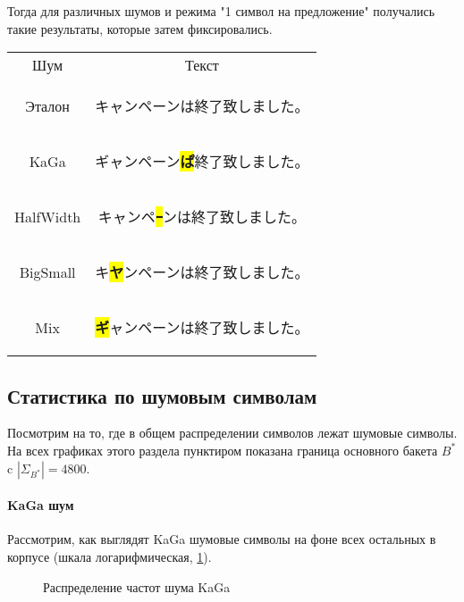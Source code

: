 Тогда для различных шумов и режима "1 символ на предложение" получались такие результаты, которые затем фиксировались.

\begin{tabular}{c|c}
	Шум 	& Текст\\
	Эталон 	& \begin{CJK}{UTF8}{min}キャンペーンは終了致しました。 \end{CJK} \\
	KaGa	&  \begin{CJK}{UTF8}{min}ギャンペーン\colorbox{yellow}{\textbf{ぱ}}終了致しました。 \end{CJK} \\
	HalfWidth &  \begin{CJK}{UTF8}{min}キャンペ\colorbox{yellow}{\textbf{ｰ}}ンは終了致しました。 \end{CJK} \\
	BigSmall &  \begin{CJK}{UTF8}{min}キ\colorbox{yellow}{\textbf{ヤ}}ンペーンは終了致しました。 \end{CJK} \\
	Mix 	&  \begin{CJK}{UTF8}{min}\colorbox{yellow}{\textbf{ギ}}ャンペーンは終了致しました。 \end{CJK} 
\end{tabular}

\subsection{ Статистика по шумовым символам }
\label{sec:noisezipfstats}

Посмотрим на то, где в общем распределении символов лежат шумовые символы. На всех графиках этого раздела пунктиром показана граница основного бакета $B^*$ c $|\Sigma_{B^*}| = 4800$.

\paragraph{ KaGa шум } Рассмотрим, как выглядят KaGa шумовые символы на фоне всех остальных в корпусе (шкала логарифмическая, \cref{plt:kaga-noise}).

\begin{figure}[H]
	\caption{Распределение частот шума KaGa}
	\label{plt:kaga-noise}
\end{figure}

